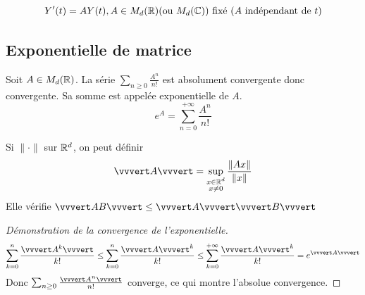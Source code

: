 \documentclass[]{report}
\begin{document}
\[Y'(t)=AY(t),A\in M_d(\mathbb{R})\text {(ou $M_d(\mathbb{C})$) fixé ($A$ indépendant de $t$)}\]

\subsection{Exponentielle de matrice}

\begin{df}
    Soit $A\in M_d(\mathbb{R})$. La série $\sum_{n\ge 0} \frac{A^n}{n!}$ est absolument convergente donc convergente. Sa somme est appelée exponentielle de $A$.
    \[e^A=\sum_{n=0}^{+\infty}\frac{A^n}{n!}\]
\end{df}

\begin{ra}
    Si $\lVert \cdot \rVert$ sur $\mathbb{R}^d$, on peut définir 
    \[\vvvert A\vvvert=\sup_{\substack{x\in\R^d\\x\neq0}} \frac{\lVert Ax \rVert}{\lVert x \rVert}\]
    Elle vérifie $\vvvert AB \vvvert\le \vvvert A \vvvert \vvvert B \vvvert$
\end{ra}

\begin{proof}[Démonstration de la convergence de l'exponentielle]
    \[\sum_{k=0}^n\frac{\vvvert A^k \vvvert}{k!}\le \sum_{k=0}^n\frac{\vvvert A\vvvert^k }{k!} \le \sum_{k=0}^{+\infty}\frac{\vvvert A\vvvert^k }{k!}=e^{\vvvert A\vvvert}\]
    Donc $\sum_{n\ge0}\frac{\vvvert A^n\vvvert}{n!}$ converge, ce qui montre l'absolue convergence.
\end{proof}
\end{document}
